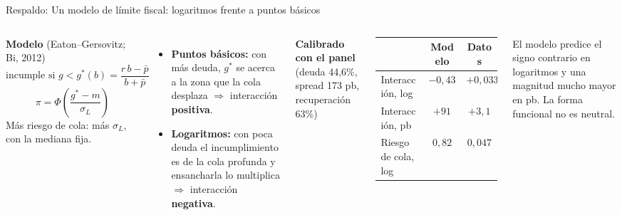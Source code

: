 \documentclass[aspectratio=169]{beamer}
\begin{document}
\begin{frame}{Respaldo: Un modelo de límite fiscal: logaritmos frente a puntos básicos}
\small
\begin{columns}[T]
\textbf{Modelo} (Eaton--Gersovitz; Bi, 2012)
\[ \text{incumple si } g<g^*(b)=\frac{r\,b-\bar p}{b+\bar p} \]
\[ \pi=\Phi\!\left(\frac{g^*-m}{\sigma_L}\right) \]
Más riesgo de cola: más $\sigma_L$, con la mediana fija.
\begin{itemize}\footnotesize
\item \textbf{Puntos básicos:} con más deuda, $g^*$ se acerca a la zona que la cola desplaza $\Rightarrow$ interacción \textbf{positiva}.
\item \textbf{Logaritmos:} con poca deuda el incumplimiento es de la cola profunda y ensancharla lo multiplica $\Rightarrow$ interacción \textbf{negativa}.
\end{itemize}
\footnotesize
\textbf{Calibrado con el panel} (deuda 44,6\%, spread 173 pb, recuperación 63\%)
\vspace{2pt}

\begin{tabular}{lcc}
\toprule
 & Modelo & Datos \\
\midrule
Interacción, log & $-0{,}43$ & $+0{,}033$ \\
Interacción, pb & $+91$ & $+3{,}1$ \\
Riesgo de cola, log & $0{,}82$ & $0{,}047$ \\
\bottomrule
\end{tabular}
\vspace{4pt}

El modelo predice el signo contrario en logaritmos y una magnitud mucho mayor en pb. La forma funcional no es neutral.
\end{columns}
\end{frame}
\end{document}

